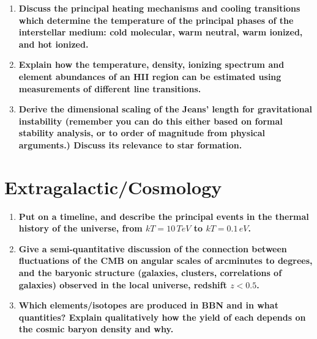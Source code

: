 \documentclass[12pt, letterpaper, preprint]{aastex}
\begin{document}
\begin{enumerate}

\item \textbf{Discuss the principal heating mechanisms and cooling
transitions which determine the temperature of the principal phases
of the interstellar medium: cold molecular, warm neutral, warm
ionized, and hot ionized.}

\item \textbf{Explain how the temperature, density, ionizing spectrum
and element abundances of an HII region can be estimated using
measurements of different line transitions.}

\item \textbf{Derive the dimensional scaling of the Jeans' length for
gravitational instability (remember you can do this either based on
formal stability analysis, or to order of magnitude from physical arguments.) Discuss its relevance to star formation.}

\end{enumerate}

\section*{Extragalactic/Cosmology}

\begin{enumerate}

\item \textbf{Put on a timeline, and describe the principal events in the
thermal history of the universe, from $kT=10\,TeV$ to $kT = 0.1\,eV$.}

\item \textbf{Give a semi-quantitative discussion of the connection between fluctuations of the CMB on angular scales of arcminutes to degrees, and the baryonic structure (galaxies, clusters, correlations of galaxies) observed in the local universe, redshift $z < 0.5$.}

\item \textbf{Which elements/isotopes are produced in BBN and in what quantities? Explain qualitatively how the yield of each depends on the cosmic baryon density and why.}

\end{enumerate}
\end{document}
